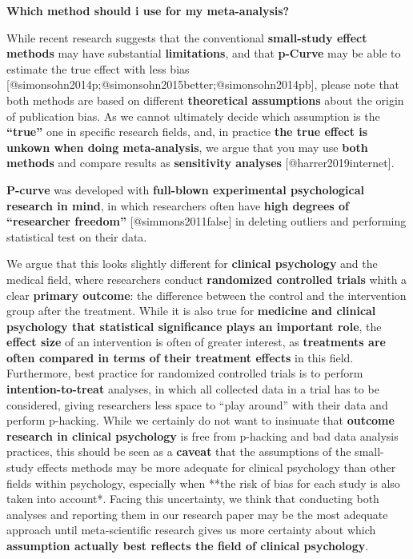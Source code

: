 \documentclass[]{book}
\begin{document}
\begin{rmdinfo}
\textbf{Which method should i use for my meta-analysis?}

While recent research suggests that the conventional \textbf{small-study
effect methods} may have substantial \textbf{limitations}, and that
\textbf{p-Curve} may be able to estimate the true effect with less bias
{[}@simonsohn2014p;@simonsohn2015better;@simonsohn2014pb{]}, please note
that both methods are based on different \textbf{theoretical
assumptions} about the origin of publication bias. As we cannot
ultimately decide which assumption is the \textbf{``true''} one in
specific research fields, and, in practice \textbf{the true effect is
unkown when doing meta-analysis}, we argue that you may use \textbf{both
methods} and compare results as \textbf{sensitivity analyses}
{[}@harrer2019internet{]}.

\textbf{P-curve} was developed with \textbf{full-blown experimental
psychological research in mind}, in which researchers often have
\textbf{high degrees of ``researcher freedom''} {[}@simmons2011false{]}
in deleting outliers and performing statistical test on their data.

We argue that this looks slightly different for \textbf{clinical
psychology} and the medical field, where researchers conduct
\textbf{randomized controlled trials} whith a clear \textbf{primary
outcome}: the difference between the control and the intervention group
after the treatment. While it is also true for \textbf{medicine and
clinical psychology that statistical significance plays an important
role}, the \textbf{effect size} of an intervention is often of greater
interest, as \textbf{treatments are often compared in terms of their
treatment effects} in this field. Furthermore, best practice for
randomized controlled trials is to perform \textbf{intention-to-treat}
analyses, in which all collected data in a trial has to be considered,
giving researchers less space to ``play around'' with their data and
perform p-hacking. While we certainly do not want to insinuate that
\textbf{outcome research in clinical psychology} is free from p-hacking
and bad data analysis practices, this should be seen as a
\textbf{caveat} that the assumptions of the small-study effects methods
may be more adequate for clinical psychology than other fields within
psychology, especially when **the risk of bias for each study is also
taken into account*. Facing this uncertainty, we think that conducting
both analyses and reporting them in our research paper may be the most
adequate approach until meta-scientific research gives us more certainty
about which \textbf{assumption actually best reflects the field of
clinical psychology}.
\end{rmdinfo}
\end{document}

